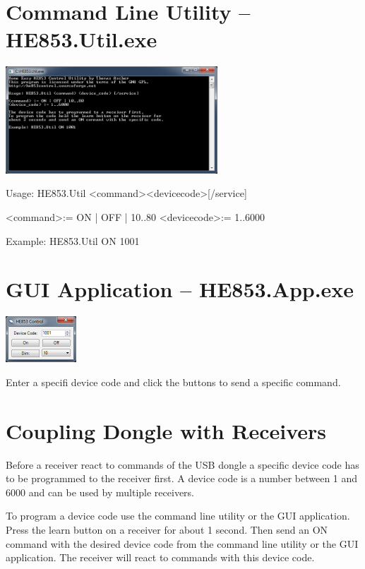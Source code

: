 \documentclass[
a4paper,
oneside,
halfparskip*,
normalheadings,
]
{scrbook}
\begin{document}
\section{Command Line Utility -- HE853.Util.exe}

\includegraphics[width=300px]{cmd.png}

Usage: HE853.Util \textless command\textgreater \textless device\textunderscore code\textgreater [/service]

\textless command\textgreater := ON | OFF | 10..80
\textless device\textunderscore code\textgreater := 1..6000

Example: HE853.Util ON 1001

\section{GUI Application -- HE853.App.exe}

\includegraphics[width=100px]{gui.png}

Enter a specifi device code and click the buttons to send a specific command.

\section{Coupling Dongle with Receivers}

Before a receiver react to commands of the USB dongle a specific device code has to be
programmed to the receiver first. A device code is a number between 1 and 6000 and can
be used by multiple receivers.

To program a device code use the command line utility or the GUI application. Press the
learn button on a receiver for about 1 second. Then send an ON command with the desired
device code from the command line utility or the GUI application. The receiver will
react to commands with this device code.
\end{document}
